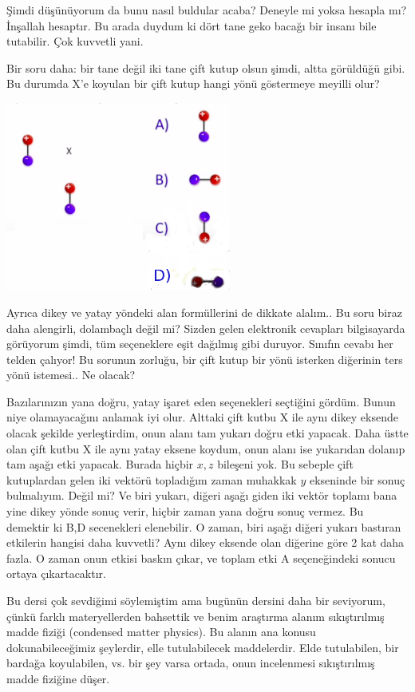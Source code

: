 \documentclass[12pt,fleqn]{article}\usepackage{../../common}
\begin{document}
Şimdi düşünüyorum da bunu nasıl buldular acaba? Deneyle mi yoksa hesapla mı?
İnşallah hesaptır. Bu arada duydum ki dört tane geko bacağı bir insanı bile
tutabilir. Çok kuvvetli yani.

Bir soru daha: bir tane değil iki tane çift kutup olsun şimdi, altta görüldüğü
gibi. Bu durumda X'e koyulan bir çift kutup hangi yönü göstermeye meyilli olur? 

\includegraphics[width=20em]{04_06.png}

Ayrıca dikey ve yatay yöndeki alan formüllerini de dikkate alalım.. Bu soru
biraz daha alengirli, dolambaçlı değil mi? Sizden gelen elektronik cevapları
bilgisayarda görüyorum şimdi, tüm seçeneklere eşit dağılmış gibi
duruyor. Sınıfın cevabı her telden çalıyor! Bu sorunun zorluğu, bir çift kutup
bir yönü isterken diğerinin ters yönü istemesi.. Ne olacak?

Bazılarınızın yana doğru, yatay işaret eden seçenekleri seçtiğini gördüm. Bunun
niye olamayacağını anlamak iyi olur. Alttaki çift kutbu X ile aynı dikey eksende
olacak şekilde yerleştirdim, onun alanı tam yukarı doğru etki yapacak. Daha
üstte olan çift kutbu X ile aynı yatay eksene koydum, onun alanı ise yukarıdan
dolanıp tam aşağı etki yapacak. Burada hiçbir $x,z$ bileşeni yok. Bu sebeple
çift kutuplardan gelen iki vektörü topladığım zaman muhakkak $y$ ekseninde bir
sonuç bulmalıyım. Değil mi? Ve biri yukarı, diğeri aşağı giden iki vektör
toplamı bana yine dikey yönde sonuç verir, hiçbir zaman yana doğru sonuç
vermez. Bu demektir ki B,D secenekleri elenebilir. O zaman, biri aşağı diğeri
yukarı bastıran etkilerin hangisi daha kuvvetli? Aynı dikey eksende olan
diğerine göre 2 kat daha fazla. O zaman onun etkisi baskın çıkar, ve toplam etki
A seçeneğindeki sonucu ortaya çıkartacaktır.

Bu dersi çok sevdiğimi söylemiştim ama bugünün dersini daha bir seviyorum, çünkü
farklı materyellerden bahsettik ve benim araştırma alanım sıkıştırılmış madde
fiziği (condensed matter physics). Bu alanın ana konusu dokunabileceğimiz
şeylerdir, elle tutulabilecek maddelerdir. Elde tutulabilen, bir bardağa
koyulabilen, vs. bir şey varsa ortada, onun incelenmesi sıkıştırılmış madde
fiziğine düşer. 
\end{document}
